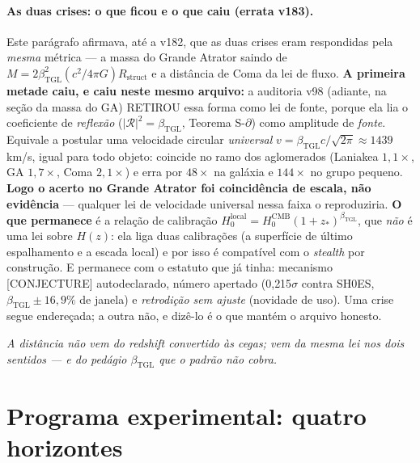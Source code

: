 \documentclass[11pt]{article}
\newcommand{\bTGL}{\beta_{\mathrm{TGL}}}\newcommand{\Msun}{M_{\odot}}\newcommand{\TGL}{\mathrm{TGL}}
\theoremstyle{definition}\newtheorem{deriv}{Derivação}
\begin{document}
\paragraph{As duas crises: o que ficou e o que caiu (errata v183).} Este parágrafo afirmava, até a v182, que as duas crises eram respondidas pela \emph{mesma} métrica --- a massa do Grande Atrator saindo de $M=2\bTGL^2(c^2/4\pi G)R_{\mathrm{struct}}$ e a distância de Coma da lei de fluxo. \textbf{A primeira metade caiu, e caiu neste mesmo arquivo:} a auditoria v98 (adiante, na seção da massa do GA) RETIROU essa forma como lei de fonte, porque ela lia o coeficiente de \emph{reflexão} ($|\mathcal{R}|^2=\bTGL$, Teorema S-$\partial$) como amplitude de \emph{fonte}. Equivale a postular uma velocidade circular \emph{universal} $v=\bTGL c/\sqrt{2\pi}\approx 1439$ km/s, igual para todo objeto: coincide no ramo dos aglomerados (Laniakea $1{,}1\times$, GA $1{,}7\times$, Coma $2{,}1\times$) e erra por $48\times$ na galáxia e $144\times$ no grupo pequeno. \textbf{Logo o acerto no Grande Atrator foi coincidência de escala, não evidência} --- qualquer lei de velocidade universal nessa faixa o reproduziria. \textbf{O que permanece} é a relação de calibração $H_0^{\mathrm{local}}=H_0^{\mathrm{CMB}}(1+z_*)^{\bTGL}$, que \emph{não} é uma lei sobre $H(z)$: ela liga duas calibrações (a superfície de último espalhamento e a escada local) e por isso é compatível com o \emph{stealth} por construção. E permanece com o estatuto que já tinha: mecanismo \textsf{[CONJECTURE]} autodeclarado, número apertado (0{,}215$\sigma$ contra SH0ES, $\bTGL\pm16{,}9\%$ de janela) e \emph{retrodição sem ajuste} (novidade de uso). Uma crise segue endereçada; a outra não, e dizê-lo é o que mantém o arquivo honesto.

\emph{A distância não vem do redshift convertido às cegas; vem da mesma lei nos dois sentidos --- e do pedágio $\bTGL$ que o padrão não cobra.}

\section{Programa experimental: quatro horizontes}\label{sec:horizontes}
\end{document}
